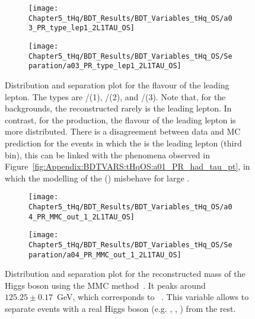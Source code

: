 \begin{figure}[h]
\centering
\begin{subfigure}{.45\textwidth}
  \centering
  \texttt{[image: Chapter5\_tHq/BDT\_Results/BDT\_Variables\_tHq\_OS/a03\_PR\_type\_lep1\_2L1TAU\_OS]}
\end{subfigure}%
\begin{subfigure}{.55\textwidth}
  \centering
  \texttt{[image: Chapter5\_tHq/BDT\_Results/BDT\_Variables\_tHq\_OS/Separation/a03\_PR\_type\_lep1\_2L1TAU\_OS]}
\end{subfigure}
\caption{Distribution and separation plot for the flavour of the leading lepton. The types are 
\Pelectron/\APelectron (1), \Pmuon/\APmuon (2), and \Ptauon/\APtauon(3). Note that, for the backgrounds,
the reconstructed \tauhad rarely is the leading lepton. In contrast, for the \tHq production, the 
flavour of the leading lepton is more distributed.
There is a disagreement between data and MC prediction for the events in which the \tauhad is the leading lepton (third bin), this
can be linked with the phenomena observed in Figure~\ref{fig:Appendix:BDTVARS:tHqOS:a01_PR_had_tau_pt}, in which the modelling
of the \pt(\tauhad) misbehave for large \pT. } 
\label{fig:Appendix:BDTVARS:tHqOS:a03_PR_type_lep1}
\end{figure}

\begin{figure}[h]
\centering
\begin{subfigure}{.45\textwidth}
  \centering
  \texttt{[image: Chapter5\_tHq/BDT\_Results/BDT\_Variables\_tHq\_OS/a04\_PR\_MMC\_out\_1\_2L1TAU\_OS]}
\end{subfigure}%
\begin{subfigure}{.55\textwidth}
  \centering
  \texttt{[image: Chapter5\_tHq/BDT\_Results/BDT\_Variables\_tHq\_OS/Separation/a04\_PR\_MMC\_out\_1\_2L1TAU\_OS]}
\end{subfigure}
\caption{Distribution and separation plot for the reconstructed mass of the Higgs boson 
using the MMC method~\cite{ELAGIN2011481}. It peaks around $125.25\pm0.17$~GeV, which corresponds to \mH~\cite{Workman:2022ynf}.  %
This variable allows to separate events with a real Higgs boson (e.g. \tWH, \tHq, \ttH) from the rest.}
\label{fig:Appendix:BDTVARS:tHqOS:a04_PR_MMC_out_1}
\end{figure}

